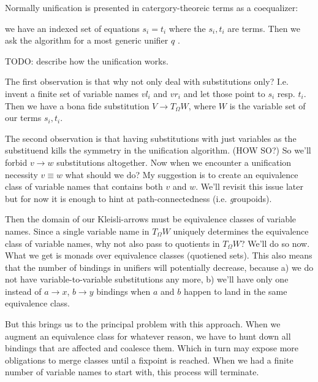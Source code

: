 \documentclass{article}
\begin{document}
Normally unification is presented in catergory-theoreic terms as a coequalizer:

we have an indexed set of equations $s_i = t_i$ where the ${s_i, t_i}$ are terms.
Then we ask the algorithm for a most generic unifier $q$ .

TODO: describe how the unification works.

The first observation is that why not only deal with substitutions only? I.e. invent a finite set of variable names $vl_i$ and $vr_i$ and let those point to $s_i$ resp. $t_i$. Then we have a bona fide substitution $V \to T_{\Omega}W$, where $W$ is the variable set of our terms ${s_i, t_i}$.

The second observation is that having substitutions with just variables as the substituend kills the symmetry in the unification algorithm. (HOW SO?) So we'll forbid $v \to w$ substitutions altogether. Now when we encounter a unification necessity $v \equiv w$ what should we do?
My suggestion is to create an equivalence class of variable names that contains both $v$ and $w$. We'll revisit this issue later but for now it is enough to hint at path-connectedness (i.e. \emph groupoids).

Then the domain of our Kleisli-arrows must be equivalence classes of variable names. Since a single variable name in $T_{\Omega}W$ uniquely determines the equivalence class of variable names, why not also pass to quotients in $T_{\Omega}W$?
We'll do so now. What we get is monads over equivalence classes (quotiened sets). This also means that the number of bindings in unifiers will potentially decrease, because \itemize
a) we do not have variable-to-variable substitutions any more,
b) we'll have only one instead of $a \to x$, $b \to y$ bindings when $a$ and $b$ happen to land in the same equivalence class.

But this brings us to the principal problem with this approach. When we augment an equivalence class for whatever reason, we have to hunt down all bindings that are affected and coalesce them. Which in turn may expose more obligations to merge classes until a fixpoint is reached. When we had a finite number of variable names to start with, this process will terminate.
\end{document}
